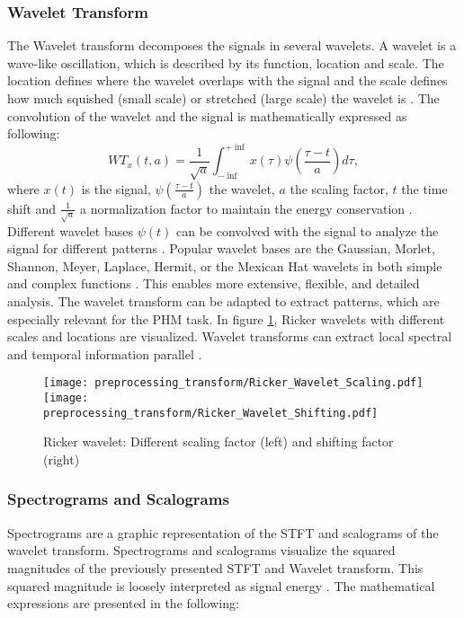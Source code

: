 \subsubsection{Wavelet Transform}
The Wavelet transform decomposes the signals in several wavelets. A wavelet is a wave-like oscillation, which is described by its function, location and scale. The location defines where the wavelet overlaps with the signal and the scale defines how much squished (small scale) or stretched (large scale) the wavelet is \cite{Sifuzzaman2009}. The convolution of the wavelet and the signal is mathematically expressed as following:
\begin{equation}
    WT_{x}(t,a) = \frac{1}{\sqrt{a}} \int_{- \inf}^{+ \inf} x(\tau) \psi(\frac{\tau -t}{a}) d \tau,
\end{equation}
 where $x(t)$ is the signal, $\psi(\frac{\tau -t}{a})$ the wavelet, $a$ the scaling factor, $t$ the time shift and $\frac{1}{\sqrt{a}}$ a normalization factor to maintain the energy conservation \cite{FENG2013}. Different wavelet bases $\psi(t)$ can be convolved with the signal to analyze the signal for different patterns \cite{Sifuzzaman2009}. Popular wavelet bases are the Gaussian, Morlet, Shannon, Meyer, Laplace, Hermit, or the Mexican Hat wavelets in both simple and complex functions \cite{Verstraete2017}. This enables more extensive, flexible, and detailed analysis. The wavelet transform can be adapted to extract patterns, which are especially relevant for the PHM task. In figure \ref{fig:ricker_wavelet}, Ricker wavelets with different scales and locations are visualized. Wavelet transforms can extract local spectral and temporal information parallel \cite{Sifuzzaman2009}.


\begin{figure}[H]
  \centering
  \texttt{[image: preprocessing\_transform/Ricker\_Wavelet\_Scaling.pdf]}
  \hspace{.1cm}
  \texttt{[image: preprocessing\_transform/Ricker\_Wavelet\_Shifting.pdf]}
  

  \caption{Ricker wavelet: Different scaling factor (left) and shifting factor (right)}
  \label{fig:ricker_wavelet}
\end{figure}

\subsubsection{Spectrograms and Scalograms}

 Spectrograms are a graphic representation of the STFT and scalograms of the wavelet transform. Spectrograms and scalograms visualize the squared magnitudes of the previously presented STFT and Wavelet transform. This squared magnitude is loosely interpreted as signal energy \cite{Hlawatsch1992}. The mathematical expressions are presented in the following: 

